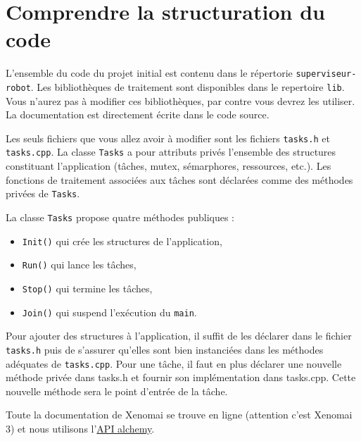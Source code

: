 \documentclass[11pt]{paper}
\begin{document}
\section{Comprendre la structuration du code}
\label{sec:code}
 L'ensemble du code du projet initial est contenu dans le répertorie {\tt superviseur-robot}. Les bibliothèques de traitement sont disponibles dans le repertoire {\tt lib}. Vous n'aurez pas à modifier ces bibliothèques, par contre vous devrez les utiliser. La documentation est directement écrite dans le code source.
 
 Les seuls fichiers que vous allez avoir à modifier sont les fichiers {\tt tasks.h} et {\tt tasks.cpp}. La classe {\tt Tasks} a pour attributs privés l'ensemble des structures constituant l'application (tâches, mutex, sémarphores, ressources, etc.). Les fonctions de traitement associées aux tâches sont déclarées comme des méthodes privées de {\tt Tasks}.
 
 La classe {\tt Tasks} propose quatre méthodes publiques :
 \begin{itemize}
 	\item {\tt Init()} qui crée les structures de l'application,
	\item {\tt Run()} qui lance les tâches,
	\item {\tt Stop()} qui termine les tâches,
	\item {\tt Join()} qui suspend l'exécution du {\tt main}.\\
 \end{itemize}

Pour ajouter des structures à l'application, il suffit de les déclarer dans le fichier {\tt tasks.h} puis de s'assurer qu'elles sont bien instanciées dans les méthodes adéquates de {\tt tasks.cpp}. Pour une tâche, il faut en plus déclarer une nouvelle méthode privée dans {tasks.h} et fournir son implémentation dans {tasks.cpp}. Cette nouvelle méthode sera le point d'entrée de la tâche.

Toute la documentation de Xenomai se trouve en ligne (attention c'est Xenomai 3) et nous utilisons l'\href{https://xenomai.org/documentation/xenomai-3/html/xeno3prm/group__alchemy.html}{API alchemy}.
\end{document}
